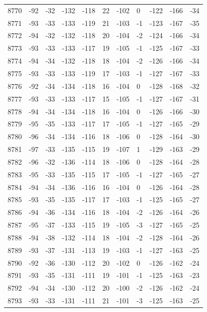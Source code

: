 \begin{table}[H]
\begin{tabular}{lllllllllll}
8770 & -92 & -32 & -132 & -118 & 22 & -102 & 0 & -122 & -166 & -34 \\
8771 & -93 & -33 & -133 & -119 & 21 & -103 & -1 & -123 & -167 & -35 \\
8772 & -94 & -32 & -132 & -118 & 20 & -104 & -2 & -124 & -166 & -34 \\
8773 & -93 & -33 & -133 & -117 & 19 & -105 & -1 & -125 & -167 & -33 \\
8774 & -94 & -34 & -132 & -118 & 18 & -104 & -2 & -126 & -166 & -34 \\
8775 & -93 & -33 & -133 & -119 & 17 & -103 & -1 & -127 & -167 & -33 \\
8776 & -92 & -34 & -134 & -118 & 16 & -104 & 0 & -128 & -168 & -32 \\
8777 & -93 & -33 & -133 & -117 & 15 & -105 & -1 & -127 & -167 & -31 \\
8778 & -94 & -34 & -134 & -118 & 16 & -104 & 0 & -126 & -166 & -30 \\
8779 & -95 & -35 & -133 & -117 & 17 & -105 & -1 & -127 & -165 & -29 \\
8780 & -96 & -34 & -134 & -116 & 18 & -106 & 0 & -128 & -164 & -30 \\
8781 & -97 & -33 & -135 & -115 & 19 & -107 & 1 & -129 & -163 & -29 \\
8782 & -96 & -32 & -136 & -114 & 18 & -106 & 0 & -128 & -164 & -28 \\
8783 & -95 & -33 & -135 & -115 & 17 & -105 & -1 & -127 & -165 & -27 \\
8784 & -94 & -34 & -136 & -116 & 16 & -104 & 0 & -126 & -164 & -28 \\
8785 & -93 & -35 & -135 & -117 & 17 & -103 & -1 & -125 & -165 & -27 \\
8786 & -94 & -36 & -134 & -116 & 18 & -104 & -2 & -126 & -164 & -26 \\
8787 & -95 & -37 & -133 & -115 & 19 & -105 & -3 & -127 & -165 & -25 \\
8788 & -94 & -38 & -132 & -114 & 18 & -104 & -2 & -128 & -164 & -26 \\
8789 & -93 & -37 & -131 & -113 & 19 & -103 & -1 & -127 & -163 & -25 \\
8790 & -92 & -36 & -130 & -112 & 20 & -102 & 0 & -126 & -162 & -24 \\
8791 & -93 & -35 & -131 & -111 & 19 & -101 & -1 & -125 & -163 & -23 \\
8792 & -94 & -34 & -130 & -112 & 20 & -100 & -2 & -126 & -162 & -24 \\
8793 & -93 & -33 & -131 & -111 & 21 & -101 & -3 & -125 & -163 & -25 \\

\end{tabular}
\end{table}
